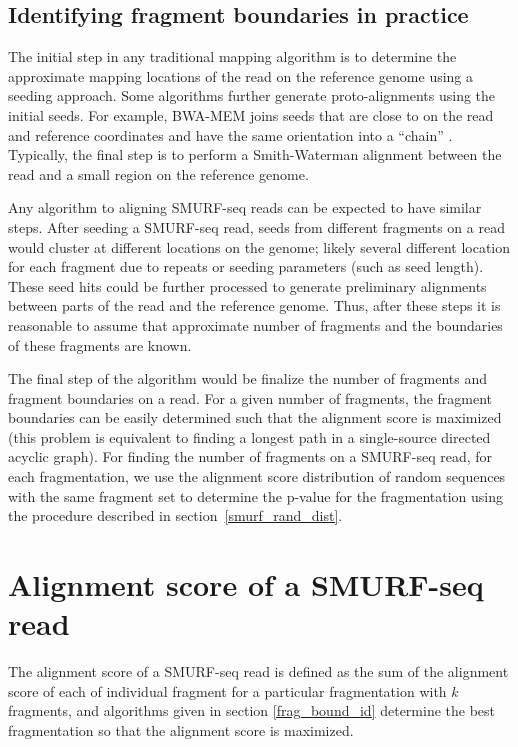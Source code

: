\subsection{Identifying fragment boundaries in practice}
The initial step in any traditional mapping algorithm is to determine
the approximate mapping locations of the read on the reference genome
using a seeding approach.
%
Some algorithms further generate proto-alignments using the initial
seeds.  For example, BWA-MEM joins seeds that are close to on the read
and reference coordinates and have the same orientation into a ``chain''
\citep{li2013aligning}.
%
Typically, the final step is to perform a Smith-Waterman alignment
between the read and a small region on the reference genome.

Any algorithm to aligning SMURF-seq reads can be expected to have
similar steps. After seeding a SMURF-seq read, seeds from different
fragments on a read would cluster at different locations on the genome;
likely several different location for each fragment due to repeats or
seeding parameters (such as seed length).
%
These seed hits could be further processed to generate preliminary
alignments between parts of the read and the reference genome.
%
Thus, after these steps it is reasonable to assume that approximate
number of fragments and the boundaries of these fragments are known.

The final step of the algorithm would be finalize the number of
fragments and fragment boundaries on a read. For a given number of
fragments, the fragment boundaries can be easily determined such that
the alignment score is maximized (this problem is equivalent to finding
a longest path in a single-source directed acyclic graph).
%
For finding the number of fragments on a SMURF-seq read, for each
fragmentation, we use the alignment score distribution of random
sequences with the same fragment set to determine the p-value for the
fragmentation using the procedure described in
section~\ref{smurf_rand_dist}.



\section{Alignment score of a SMURF-seq read}
\label{smurf_aln_score}
The alignment score of a SMURF-seq read is defined as the sum of the
alignment score of each of individual fragment for a particular
fragmentation with $k$ fragments, and algorithms given in section
\ref{frag_bound_id} determine the best fragmentation so that the
alignment score is maximized.

